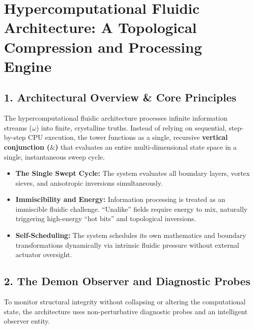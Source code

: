 \chapter{\texorpdfstring{Hypercomputational Fluidic Architecture: A Topological Compression and Processing Engine}{Hypercomputational Fluidic Architecture: A Topological Compression and Processing Engine}}
\label{chap:fluidic-1-demon-uroboros-construct-kit}

\section{\texorpdfstring{1. Architectural Overview \& Core Principles}{1. Architectural Overview \& Core Principles}}

The hypercomputational fluidic architecture processes infinite information streams (\(\omega\)) into finite, crystalline truths. Instead of relying on sequential, step-by-step CPU execution, the tower functions as a single, recursive \textbf{vertical conjunction (\(\&\))} that evaluates an entire multi-dimensional state space in a single, instantaneous sweep cycle.

\begin{itemize}
\item \textbf{The Single Swept Cycle:} The system evaluates all boundary layers, vortex sieves, and anisotropic inversions simultaneously.
\item \textbf{Immiscibility and Energy:} Information processing is treated as an immiscible fluidic challenge. “Unalike” fields require energy to mix, naturally triggering high-energy “hot bits” and topological inversions.
\item \textbf{Self-Scheduling:} The system schedules its own mathematics and boundary transformations dynamically via intrinsic fluidic pressure without external actuator oversight.
\end{itemize}

\medskip

\section{\texorpdfstring{2. The Demon Observer and Diagnostic Probes}{2. The Demon Observer and Diagnostic Probes}}

To monitor structural integrity without collapsing or altering the computational state, the architecture uses non-perturbative diagnostic probes and an intelligent observer entity.

